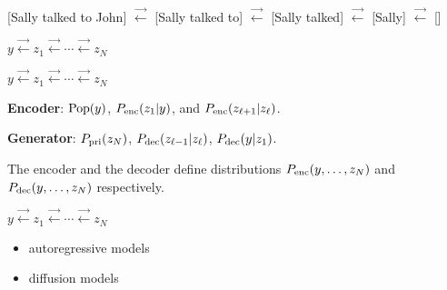 {\vfill
{\huge
\centerline{{\color{red} [Sally talked to John]} $\stackrel{\rightarrow}{\leftarrow}$ {\color{red} [Sally talked to]}
$\stackrel{\rightarrow}{\leftarrow}$ {\color{red}[Sally talked]} $\stackrel{\rightarrow}{\leftarrow}$ {\color{red}[Sally]} $\stackrel{\rightarrow}{\leftarrow}$ {\color{red} []}}
}

\vfill
\centerline{$y \stackrel{\rightarrow}{\leftarrow} z_1  \stackrel{\rightarrow}{\leftarrow} \cdots \stackrel{\rightarrow}{\leftarrow} z_N$}

\centerline{$y \stackrel{\rightarrow}{\leftarrow} z_1  \stackrel{\rightarrow}{\leftarrow} \cdots \stackrel{\rightarrow}{\leftarrow} z_N$}

\vfill
{\bf Encoder}: $\mathrm{Pop}(y)$, $P_{\mathrm{enc}}(z_1|y)$, and $P_{\mathrm{enc}}(z_{\ell+1}|z_\ell)$.


\vfill
{\bf Generator}: $P_{\mathrm{pri}}(z_N)$, $P_{\mathrm{dec}}(z_{\ell-1}|z_\ell)$, $P_{\mathrm{dec}}(y|z_1)$.

\vfill
The encoder and the decoder define distributions $P_{\mathrm{enc}}(y,\ldots,z_N)$ and $P_{\mathrm{dec}}(y,\ldots,z_N)$ respectively.



\centerline{$y \stackrel{\rightarrow}{\leftarrow} z_1  \stackrel{\rightarrow}{\leftarrow} \cdots \stackrel{\rightarrow}{\leftarrow} z_N$}

\vfill
\begin{itemize}
\item autoregressive models

\vfill
\item diffusion models
\end{itemize}



}
